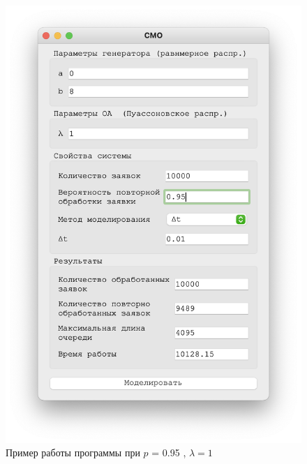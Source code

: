 \begin{figure}[!htb]
\begin{minipage}{0.55\textwidth}
      \includegraphics[width=1\linewidth]{1-95-t}
    \end{minipage}
    \caption{Пример работы программы при $p$ = 0.95 , $\lambda = 1$}
 \end{figure}


